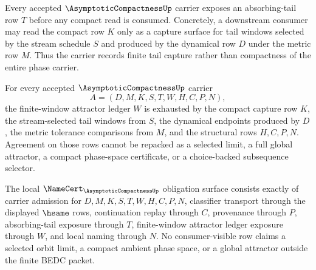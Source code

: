 \begin{theorem}
\label{thm:asymptotic-compactness-absorbing-tail-carrier}
Every accepted $\AsymptoticCompactnessUp$ carrier exposes an absorbing-tail row $T$ before any compact read is consumed. Concretely, a downstream consumer may read the compact row $K$ only as a capture surface for tail windows selected by the stream schedule $S$ and produced by the dynamical row $D$ under the metric row $M$. Thus the carrier records finite tail capture rather than compactness of the entire phase carrier.
\end{theorem}

\begin{theorem}
\label{thm:asymptotic-compactness-finite-window-attractor-ledger}
For every accepted $\AsymptoticCompactnessUp$ carrier
$$
A=(D,M,K,S,T,W,H,C,P,N),
$$
the finite-window attractor ledger $W$ is exhausted by the compact capture row $K$, the stream-selected tail windows from $S$, the dynamical endpoints produced by $D$, the metric tolerance comparisons from $M$, and the structural rows $H,C,P,N$. Agreement on those rows cannot be repacked as a selected limit, a full global attractor, a compact phase-space certificate, or a choice-backed subsequence selector.
\end{theorem}

\begin{theorem}
\label{thm:asymptotic-compactness-namecert-obligations}
The local $\NameCert_{\AsymptoticCompactnessUp}$ obligation surface consists exactly of carrier admission for $D,M,K,S,T,W,H,C,P,N$, classifier transport through the displayed $\hsame$ rows, continuation replay through $C$, provenance through $P$, absorbing-tail exposure through $T$, finite-window attractor ledger exposure through $W$, and local naming through $N$. No consumer-visible row claims a selected orbit limit, a compact ambient phase space, or a global attractor outside the finite BEDC packet.
\end{theorem}


